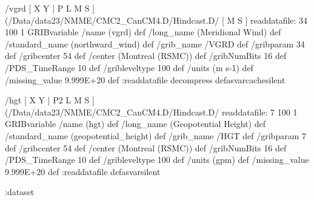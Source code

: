 \begin{ingrid}
/vgrd {
[ X Y | P L M S ]
(/Data/data23/NMME/CMC2_CanCM4.D/Hindcast.D/%
[ M S ]
readdatafile:
34 100 1 GRIBvariable 
/name (vgrd) def
/long_name (Meridional Wind) def
/standard_name (northward_wind) def
/grib_name /VGRD def
/gribparam 34 def
/gribcenter 54 def
/center (Montreal (RSMC)) def
/gribNumBits 16 def
/PDS_TimeRange 10 def
/gribleveltype 100 def
/units (m s-1) def
/missing_value 9.999E+20 def
:readdatafile decompress
} defasvarcachesilent

/hgt {
[ X Y | P2 L M S ] (/Data/data23/NMME/CMC2_CanCM4.D/Hindcast.D/%
readdatafile:
7 100 1 GRIBvariable 
/name (hgt) def
/long_name (Geopotential Height) def
/standard_name (geopotential_height) def
/grib_name /HGT def
/gribparam 7 def
/gribcenter 54 def
/center (Montreal (RSMC)) def
/gribNumBits 16 def
/PDS_TimeRange 10 def
/gribleveltype 100 def
/units (gpm) def
/missing_value 9.999E+20 def
:readdatafile
} defasvarsilent

:dataset
\end{ingrid}
